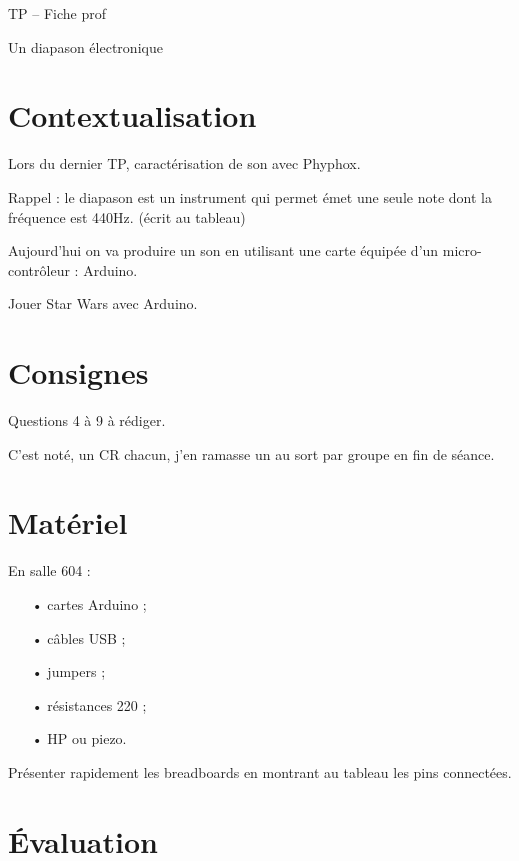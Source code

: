 \documentclass[12pt,a4paper]{article}
\begin{document}
\begin{header}
TP -- Fiche prof

Un diapason électronique
\end{header}

\section*{Contextualisation}

Lors du dernier TP, caractérisation de son avec Phyphox.

Rappel : le diapason est un instrument qui permet émet une seule note dont la fréquence est \unit{440}{Hz}. (écrit au tableau)

Aujourd'hui on va produire un son en utilisant une carte équipée d'un micro-contrôleur : Arduino.

Jouer Star Wars avec Arduino.

\section*{Consignes}

Questions 4 à 9 à rédiger.

C'est noté, un CR chacun, j'en ramasse un au sort par groupe en fin de séance.

\section*{Matériel}

En salle 604 :
\begin{itemize}
\item[•] cartes Arduino ;
\item[•] câbles USB ;
\item[•] jumpers ;
\item[•] résistances \unit{220}{\ohm} ;
\item[•] HP ou piezo.
\end{itemize}

Présenter rapidement les breadboards en montrant au tableau les pins connectées. 

\section*{Évaluation}
\end{document}
